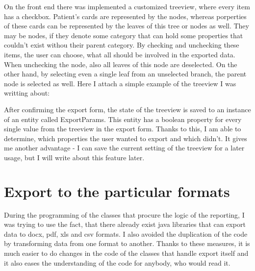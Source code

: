 \documentclass[thesis=B,english]{FITthesis}[2012/10/20]
\begin{document}
On the front end there was implemented a customized treeview, where every item has a checkbox. Patient's cards are represented by the nodes, whereas porperties of these cards can be represented by the leaves of this tree or nodes as well. They may be nodes, if they denote some category that can hold some properties that couldn't exist withou their parent category. By checking and unchecking these items, the user can choose, what all should be involved in the exported data. When unchecking the node, also all leaves of this node are deselected. On the other hand, by selecting even a single leaf from an unselected branch, the parent node is selected as well.
Here I attach a simple example of the treeview I was writting about:


\begin{figure}[ht]
\end{figure}

After confirming the export form, the state of the treeview is saved to an instance of an entity called ExportParams. This entity has a boolean property for every single value from the treeview in the export form. Thanks to this, I am able to determine, which properties the user wanted to export and which didn't. It gives me another advantage - I can save the current setting of the treeview for a later usage, but I will write about this feature later.

\section{Export to the particular formats}
During the  programming of the classes that procure the logic of the reporting, I was trying to use the fact, that there already exist java libraries that can export data to docx, pdf, xls and csv formats. I also avoided the duplication of the code by transforming data from one format to another. Thanks to these measures, it is much easier to do changes in the code of the classes that handle export itself and it also eases the understanding of the code for anybody, who would read it.
\end{document}
